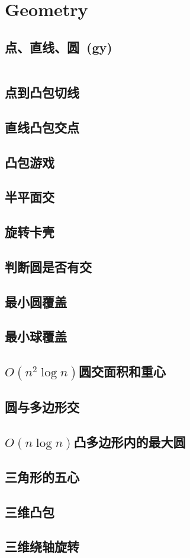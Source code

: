 \chapter{Geometry}
\section{点、直线、圆\ \small(gy)}
	\inputminted{cpp}{Geometry/basic_geometry.cpp}
\section{点到凸包切线}
\section{直线凸包交点}
\section{凸包游戏}
\section{半平面交}
\section{旋转卡壳}
\section{判断圆是否有交}
\section{最小圆覆盖}
\section{最小球覆盖}
\section{$ O(n ^ 2 \log n) $圆交面积和重心}
\section{圆与多边形交}
\section{$ O(n \log n) $凸多边形内的最大圆}
\section{三角形的五心}
\section{三维凸包}
\section{三维绕轴旋转}